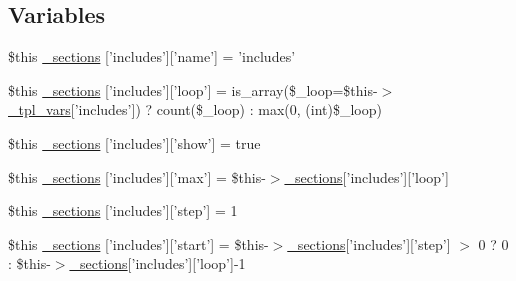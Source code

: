 \subsection*{\-Variables}
\begin{DoxyCompactItemize}
\item 
\$this \hyperlink{default_234d6fa4bfd5eef6424a9ddc74a166350_2_06_06176_05_06_061767056382_05include_8tpl_8php_a42ca7b4750948906f9467ef3d2ef626a}{\-\_\-sections} \mbox{[}'includes'\mbox{]}\mbox{[}'name'\mbox{]} = 'includes'
\item 
\$this \hyperlink{default_234d6fa4bfd5eef6424a9ddc74a166350_2_06_06176_05_06_061767056382_05include_8tpl_8php_a6165925f226253acd82e451b4e38b8c4}{\-\_\-sections} \mbox{[}'includes'\mbox{]}\mbox{[}'loop'\mbox{]} = is\-\_\-array(\$\-\_\-loop=\$this-\/$>$\hyperlink{_06_06127_05_06_0612781687_05pkgelementindex_8tpl_8php_a4a4846d8e68d455590131a05697f67a3}{\-\_\-tpl\-\_\-vars}\mbox{[}'includes'\mbox{]}) ? count(\$\-\_\-loop) \-: max(0, (int)\$\-\_\-loop)
\item 
\$this \hyperlink{default_234d6fa4bfd5eef6424a9ddc74a166350_2_06_06176_05_06_061767056382_05include_8tpl_8php_a890296d548cee37e6047b68403f77d63}{\-\_\-sections} \mbox{[}'includes'\mbox{]}\mbox{[}'show'\mbox{]} = true
\item 
\$this \hyperlink{default_234d6fa4bfd5eef6424a9ddc74a166350_2_06_06176_05_06_061767056382_05include_8tpl_8php_afa98952c2805af1b15e2d1750084cad6}{\-\_\-sections} \mbox{[}'includes'\mbox{]}\mbox{[}'max'\mbox{]} = \$this-\/$>$\hyperlink{_06_06127_05_06_0612781687_05pkgelementindex_8tpl_8php_a9e3d26b39edfe29c3f29b8035ef33828}{\-\_\-sections}\mbox{[}'includes'\mbox{]}\mbox{[}'loop'\mbox{]}
\item 
\$this \hyperlink{default_234d6fa4bfd5eef6424a9ddc74a166350_2_06_06176_05_06_061767056382_05include_8tpl_8php_a3d18d8efa906a295c53f569591b27592}{\-\_\-sections} \mbox{[}'includes'\mbox{]}\mbox{[}'step'\mbox{]} = 1
\item 
\$this \hyperlink{default_234d6fa4bfd5eef6424a9ddc74a166350_2_06_06176_05_06_061767056382_05include_8tpl_8php_a0e2e77601249107999f96703994e1c8c}{\-\_\-sections} \mbox{[}'includes'\mbox{]}\mbox{[}'start'\mbox{]} = \$this-\/$>$\hyperlink{_06_06127_05_06_0612781687_05pkgelementindex_8tpl_8php_a9e3d26b39edfe29c3f29b8035ef33828}{\-\_\-sections}\mbox{[}'includes'\mbox{]}\mbox{[}'step'\mbox{]} $>$ 0 ? 0 \-: \$this-\/$>$\hyperlink{_06_06127_05_06_0612781687_05pkgelementindex_8tpl_8php_a9e3d26b39edfe29c3f29b8035ef33828}{\-\_\-sections}\mbox{[}'includes'\mbox{]}\mbox{[}'loop'\mbox{]}-\/1

\end{DoxyCompactItemize}
